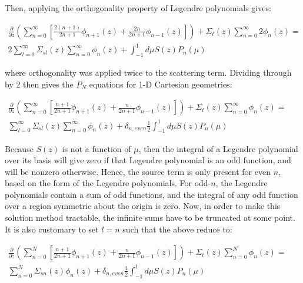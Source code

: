 \documentclass[10pt]{article}
\begin{document}
Then, applying the orthogonality property of Legendre polynomials gives:

  \begin{equation}
\label{eq:PNStep4}
\begin{aligned}
\frac{\partial}{\partial z}\left(\sum_{n=0}^{\infty}\left\lbrack\frac{2(n+1)}{2n+1}\phi_{n+1}(z) +\frac{2n}{2n+1} \phi_{n-1}(z)\right\rbrack\right) + \Sigma_t(z)\sum_{n=0}^{\infty}2\phi_n(z) =\quad\quad\\
2\sum_{l=0}^{\infty}\Sigma_{sl}(z)\sum_{n=0}^{\infty}\phi_n(z) + \int_{-1}^{1}d\mu S(z)P_n(\mu)
 \end{aligned}
 \end{equation}

where orthogonality was applied twice to the scattering term. Dividing through by 2 then gives the \(P_N\) equations for 1-D Cartesian geometries:

\begin{equation}
\label{eq:PNStep5}
\begin{aligned}
\frac{\partial}{\partial z}\left(\sum_{n=0}^{\infty}\left\lbrack\frac{n+1}{2n+1}\phi_{n+1}(z) +\frac{n}{2n+1} \phi_{n-1}(z)\right\rbrack\right) + \Sigma_t(z)\sum_{n=0}^{\infty}\phi_n(z) =\quad\quad\\
\sum_{l=0}^{\infty}\Sigma_{sl}(z)\sum_{n=0}^{\infty}\phi_n(z) + \delta_{n,even}\frac{1}{2}\int_{-1}^{1}d\mu S(z)P_n(\mu)
 \end{aligned}
 \end{equation}

Because \(S(z)\) is not a function of \(\mu\), then the integral of a Legendre polynomial over its basis will give zero if that Legendre polynomial is an odd function, and will be nonzero otherwise. Hence, the source term is only present for even \(n\), based on the form of the Legendre polynomials. For odd-\(n\), the Legendre polynomials contain a sum of odd functions, and the integral of any odd function over a region symmetric about the origin is zero. Now, in order to make this solution method tractable, the infinite sums have to be truncated at some point. It is also customary to set \(l=n\) such that the above reduce to:

\begin{equation}
\label{eq:PNStep6}
\begin{aligned}
\frac{\partial}{\partial z}\left(\sum_{n=0}^{N}\left\lbrack\frac{n+1}{2n+1}\phi_{n+1}(z) +\frac{n}{2n+1} \phi_{n-1}(z)\right\rbrack\right) + \Sigma_t(z)\sum_{n=0}^{N}\phi_n(z) =\quad\quad\\
\sum_{n=0}^{N}\Sigma_{sn}(z)\phi_n(z) +  \delta_{n,even}\frac{1}{2}\int_{-1}^{1}d\mu S(z)P_n(\mu)
 \end{aligned}
 \end{equation}
\end{document}
